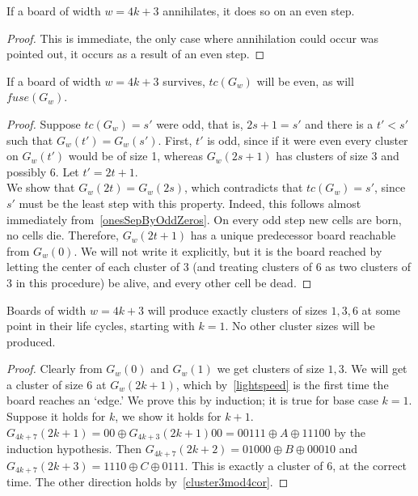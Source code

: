 \documentclass[12pt,letterpaper]{article}
\begin{document}
\begin{cor}\label{3mod4annihilateOnEven}
  If a board of width $w=4k+3$ annihilates, it does so on an even step.
\end{cor}
\begin{proof}
  This is immediate, the only case where annihilation could occur was pointed out, it occurs as a result of an even step.
\end{proof}
\begin{prop}\label{cycleOnEven3mod4}
  If a board of width $w=4k+3$ survives, $tc(G_w)$ will be even, as will $fuse(G_w)$. 
\end{prop}
\begin{proof}
  Suppose $tc(G_w)=s'$ were odd, that is, $2s+1=s'$ and there is a $t'<s'$ such that $G_w(t')=G_w(s')$. First, $t'$ is odd, since if it were even every cluster on $G_w(t')$ would be of size 1, whereas $G_w(2s+1)$ has clusters of size 3 and possibly 6. Let $t'=2t+1$. \\
  We show that $G_w(2t)=G_w(2s)$, which contradicts that $tc(G_w)=s'$, since $s'$ must be the least step with this property. Indeed, this follows almost immediately from~\cref{onesSepByOddZeros}. On every odd step new cells are born, no cells die. Therefore, $G_w(2t+1)$ has a unique predecessor board reachable from $G_w(0)$. We will not write it explicitly, but it is the board reached by letting the center of each cluster of 3 (and treating clusters of 6 as two clusters of 3 in this procedure) be alive, and every other cell be dead.
\end{proof}

\begin{prop}\label{cluster3mod4} %
  Boards of width $w=4k+3$ will produce exactly clusters of sizes $1,3,6$ at some point in their life cycles, starting with $k=1$. No other cluster sizes will be produced.
\end{prop}
\begin{proof}
  Clearly from $G_w(0)$ and $G_w(1)$ we get clusters of size $1,3$. We will get a cluster of size $6$ at $G_w(2k+1)$, which by~\cref{lightspeed} is the first time the board reaches an `edge.' We prove this by induction; it is true for base case $k=1$. Suppose it holds for $k$, we show it holds for $k+1$. $G_{4k+7}(2k+1) = 00\oplus G_{4k+3}(2k+1)00 = 00111\oplus A\oplus 11100$ by the induction hypothesis. Then $G_{4k+7}(2k+2)=01000\oplus B\oplus 00010$ and $G_{4k+7}(2k+3)=1110\oplus C\oplus 0111$. This is exactly a cluster of 6, at the correct time. The other direction holds by~\cref{cluster3mod4cor}.
\end{proof}
\end{document}
